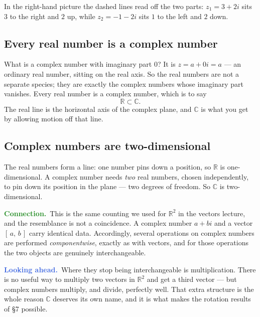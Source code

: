 \documentclass[11pt]{article}
\theoremstyle{definition}
\theoremstyle{remark}
\newcommand{\lookahead}{\par\smallskip\noindent
  \textbf{\sffamily\textcolor{RoyalBlue}{Looking ahead.}}\ \ignorespaces}
\newcommand{\lookback}{\par\smallskip\noindent
  \textbf{\sffamily\textcolor{ForestGreen}{Connection.}}\ \ignorespaces}
\newcommand{\R}{\mathbb{R}}
\newcommand{\C}{\mathbb{C}}
\begin{document}
\noindent In the right-hand picture the dashed lines read off the two parts:
$z_1=3+2i$ sits $3$ to the right and $2$ up, while $z_2=-1-2i$ sits $1$ to the
left and $2$ down.

\subsection{Every real number is a complex number}
What is a complex number with imaginary part $0$? It is $z=a+0i=a$ --- an
ordinary real number, sitting on the real axis. So the real numbers are not a
separate species; they are exactly the complex numbers whose imaginary part
vanishes. Every real number is a complex number, which is to say
\[
  \R \subset \C .
\]
The real line is the horizontal axis of the complex plane, and $\C$ is what you
get by allowing motion off that line.

\subsection{Complex numbers are two-dimensional}
The real numbers form a line: one number pins down a position, so $\R$ is
one-dimensional. A complex number needs \emph{two} real numbers, chosen
independently, to pin down its position in the plane --- two degrees of freedom.
So $\C$ is two-dimensional.

\lookback This is the same counting we used for $\R^{2}$ in the vectors lecture,
and the resemblance is not a coincidence. A complex number $a+bi$ and a vector
$[\,a,\,b\,]$ carry identical data. Accordingly, several operations on complex
numbers are performed \emph{componentwise}, exactly as with vectors, and for
those operations the two objects are genuinely interchangeable.

\lookahead Where they stop being interchangeable is multiplication. There is no
useful way to multiply two vectors in $\R^{2}$ and get a third vector --- but
complex numbers multiply, and divide, perfectly well. That extra structure is
the whole reason $\C$ deserves its own name, and it is what makes the rotation
results of \S7 possible.

\end{document}

